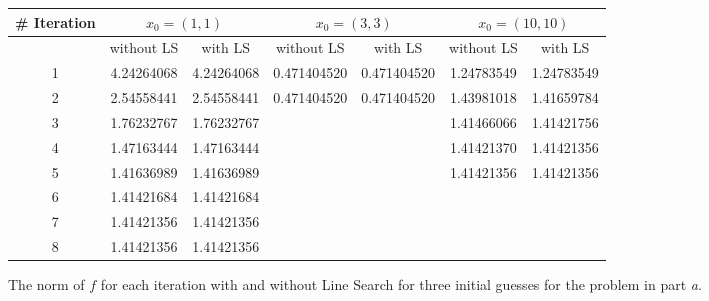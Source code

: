 \begin{figure}[H]
 \centering
\begin{tabular}{ |c || c|c || c|c ||   c|c|}
 \hline
 \# Iteration  &\multicolumn{2}{|c||}{$x_{0}=(1,1)$} & \multicolumn{2}{|c||}{$x_{0}=(3,3)$} & \multicolumn{2}{|c|}{ $x_{0}=(10,10)$}\\ 
  \hline
 	& without LS & with LS & without LS & with LS & without LS & with LS\\
  \hhline{|=|=|=|=|=|=|=|}  
 1  &4.24264068	&4.24264068 &0.471404520 &0.471404520 &1.24783549 &1.24783549 \\
   \hline                                                                    
 2  &2.54558441	&2.54558441 &0.471404520 &0.471404520 &1.43981018 &1.41659784 \\
   \hline                                                                    
 3  &1.76232767	&1.76232767 &            &            &1.41466066 &1.41421756 \\
   \hline                                                                    
 4  &1.47163444	&1.47163444 &            &            &1.41421370 &1.41421356 \\
   \hline                                                                    
 5  &1.41636989	&1.41636989 &            &            &1.41421356 &1.41421356 \\
   \hline                                            
 6  &1.41421684	&1.41421684 &            &            &           &          \\
   \hline                                                                    
 7  &1.41421356	&1.41421356 &            &            &           &          \\
   \hline                                                                    
 8  &1.41421356  &1.41421356 &            &            &           &          \\
   \hline
\end{tabular} 
  \caption{The norm of $f$ for each iteration with and without Line Search for three initial guesses for the problem in part \emph{a}.}
   \label{tab:part_a}
\end{figure} 


